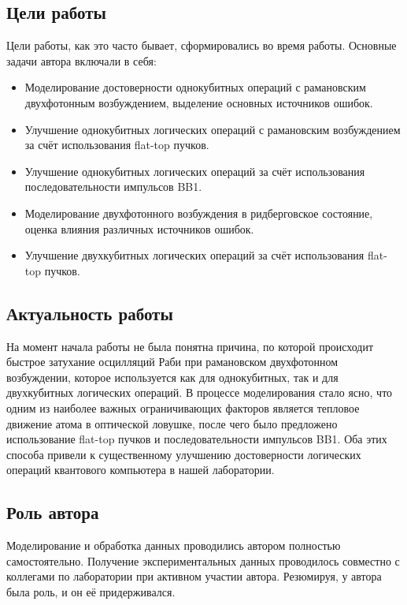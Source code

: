 \subsection{Цели работы}

Цели работы, как это часто бывает, сформировались во время работы. Основные задачи автора включали в себя:

\begin{itemize}
	\item Моделирование достоверности однокубитных операций с рамановским двухфотонным возбуждением, выделение основных источников ошибок.

	\item Улучшение однокубитных логических операций с рамановским возбуждением за счёт использования flat-top пучков. 

	\item Улучшение однокубитных логических операций за счёт использования последовательности импульсов BB1.

	\item Моделирование двухфотонного возбуждения в ридберговское состояние, оценка влияния различных источников ошибок.

	\item Улучшение двухкубитных логических операций за счёт использования flat-top пучков. 
\end{itemize}

\subsection{Актуальность работы}

На момент начала работы не была понятна причина, по которой происходит быстрое затухание осцилляций Раби при рамановском двухфотонном возбуждении, которое используется как для однокубитных, так и для двухкубитных логических операций. В процессе моделирования стало ясно, что одним из наиболее важных ограничивающих факторов является тепловое движение атома в оптической ловушке, после чего было предложено использование flat-top пучков и последовательности импульсов BB1. Оба этих способа привели к существенному улучшению достоверности логических операций квантового компьютера в нашей лаборатории. 

\subsection{Роль автора}

Моделирование и обработка данных проводились автором полностью самостоятельно. Получение экспериментальных данных проводилось совместно с коллегами по лаборатории при активном участии автора. Резюмируя, у автора была роль, и он её придерживался.

